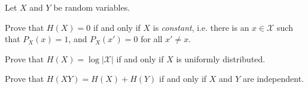 \documentclass[a4paper,10pt,landscape,twocolumn]{scrartcl}
\begin{document}
\begin{exercise}
Let $X$ and $Y$ be random variables.
	\begin{subex}
	Prove that $H(X) = 0$ if and only if $X$ is \emph{constant}, i.e. there is an $x \in \mathcal{X}$ such that $P_X(x) = 1$, and $P_X(x') = 0$ for all $x' \neq x$.
	\end{subex}
	
	\begin{subex}
	Prove that $H(X) = \log |\mathcal{X}|$ if and only if $X$ is uniformly distributed.
	\end{subex}
	
	\begin{subex}
	Prove that $H(XY) = H(X) + H(Y)$ if and only if $X$ and $Y$ are independent.
	\end{subex}
\end{exercise}
\end{document}
